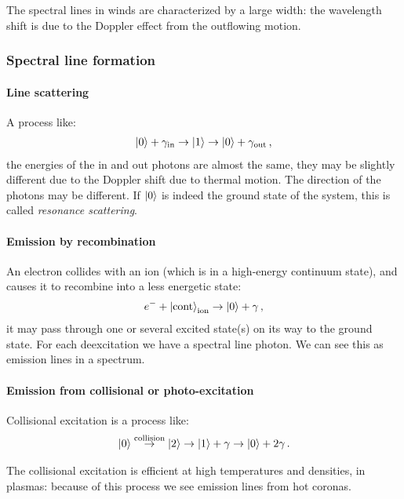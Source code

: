 \documentclass[main.tex]{subfiles}
\begin{document}
The spectral lines in winds are characterized by a large width: the wavelength shift is due to the Doppler effect from the outflowing motion.
\subsubsection{Spectral line formation}

\paragraph{Line scattering}
A process like: 
%
\begin{align}
\ket{0} + \gamma _{\text{in}} \rightarrow \ket{1}
\rightarrow \ket{0} + \gamma _{\text{out}}
\,,
\end{align}
%
the energies of the in and out photons are almost the same, they may be slightly different due to the Doppler shift due to thermal motion.
The direction of the photons may be different. If \(\ket{0}\) is indeed the ground state of the system, this is called \emph{resonance scattering}. 

\paragraph{Emission by recombination}
An electron collides with an ion (which is in a high-energy continuum state), and causes it to recombine into a less energetic state: 
%
\begin{align}
e^{-} + \ket{\text{cont}}_{\text{ion}} 
\rightarrow
\ket{0} + \gamma 
\,,
\end{align}
%
it may pass through one or several excited state(s) on its way to the ground state.
For each deexcitation we have a spectral line photon.
We can see this as emission lines in a spectrum.

\paragraph{Emission from collisional or photo-excitation}
Collisional excitation is a process like:
%
\begin{align}
\ket{0} \overset{\text{collision}}{\rightarrow} \ket{2} \rightarrow \ket{1} + \gamma 
\rightarrow \ket{0} + 2 \gamma 
\,.
\end{align}
%

The collisional excitation is efficient at high temperatures and densities, in plasmas: because of this process we see emission lines from hot coronas.
\end{document}
